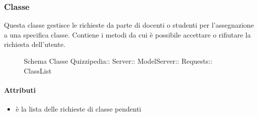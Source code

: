 \subsubsection{Classe }
Questa classe gestisce le richieste da parte di docenti o studenti per l'assegnazione a una specifica classe. Contiene i metodi da cui è possibile accettare o rifiutare la richiesta dell'utente.
\begin{figure}[H]
\centering
\noindent{}
\caption[Schema Classe ClassList]{Schema Classe Quizzipedia:: Server:: ModelServer:: Requests:: ClassList}
\end{figure}
\paragraph{Attributi}
\begin{itemize}
\item {}
\newline
è la lista delle richieste di classe pendenti
\end{itemize}
